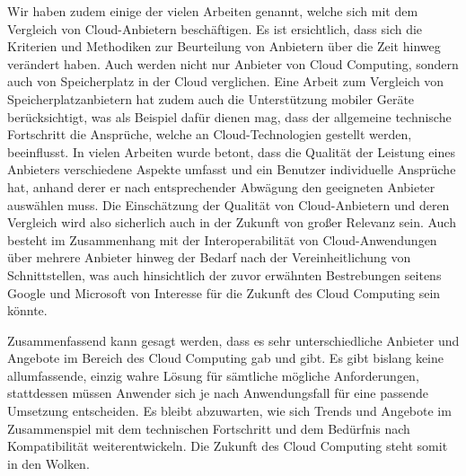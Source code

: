 Wir haben zudem einige der vielen Arbeiten genannt, welche sich mit dem Vergleich von Cloud-Anbietern beschäftigen. 
Es ist ersichtlich, dass sich die Kriterien und Methodiken zur Beurteilung von Anbietern über die Zeit hinweg verändert haben. 
Auch werden nicht nur Anbieter von Cloud Computing, sondern auch von Speicherplatz in der Cloud verglichen. 
Eine Arbeit zum Vergleich von Speicherplatzanbietern hat zudem auch die Unterstützung mobiler Geräte berücksichtigt, was als Beispiel dafür dienen mag, dass der allgemeine technische Fortschritt die Ansprüche, welche an Cloud-Technologien gestellt werden, beeinflusst. 
In vielen Arbeiten wurde betont, dass die Qualität der Leistung eines Anbieters verschiedene Aspekte umfasst und ein Benutzer individuelle Ansprüche hat, anhand derer er nach entsprechender Abwägung den geeigneten Anbieter auswählen muss. 
Die Einschätzung der Qualität von Cloud-Anbietern und deren Vergleich wird also  sicherlich auch in der Zukunft von großer Relevanz sein. 
Auch besteht im Zusammenhang mit der Interoperabilität von Cloud-Anwendungen über mehrere Anbieter hinweg der Bedarf nach der Vereinheitlichung von Schnittstellen, was auch hinsichtlich der zuvor erwähnten Bestrebungen seitens Google und Microsoft von Interesse für die Zukunft des Cloud Computing sein könnte.


Zusammenfassend kann gesagt werden, dass es sehr unterschiedliche Anbieter und Angebote im Bereich des Cloud Computing gab und gibt. 
Es gibt bislang keine allumfassende, einzig wahre Lösung für sämtliche mögliche Anforderungen, stattdessen müssen Anwender sich je nach Anwendungsfall für eine passende Umsetzung entscheiden. 
Es bleibt abzuwarten, wie sich Trends und Angebote im Zusammenspiel mit dem technischen Fortschritt und dem Bedürfnis nach Kompatibilität weiterentwickeln. 
Die Zukunft des Cloud Computing steht somit in den Wolken.
